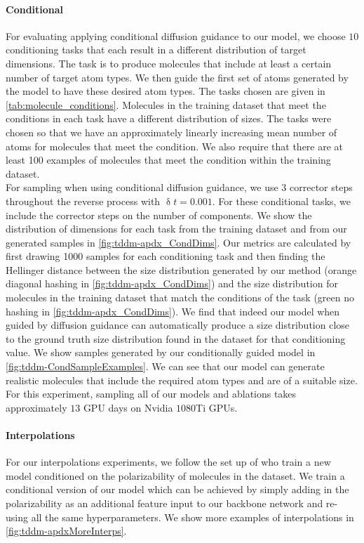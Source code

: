 \paragraph{Conditional}
For evaluating applying conditional diffusion guidance to our model, we choose $10$ conditioning tasks that each result in a different distribution of target dimensions. The task is to produce molecules that include at least a certain number of target atom types. We then guide the first set of atoms generated by the model to have these desired atom types. The tasks chosen are given in \cref{tab:molecule_conditions}. Molecules in the training dataset that meet the conditions in each task have a different distribution of sizes. The tasks were chosen so that we have an approximately linearly increasing mean number of atoms for molecules that meet the condition. We also require that there are at least 100 examples of molecules that meet the condition within the training dataset.\\

For sampling when using conditional diffusion guidance, we use $3$ corrector steps throughout the reverse process with $\updelta t = 0.001$. For these conditional tasks, we include the corrector steps on the number of components. We show the distribution of dimensions for each task from the training dataset and from our generated samples in \cref{fig:tddm-apdx_CondDims}. Our metrics are calculated by first drawing 1000 samples for each conditioning task and then finding the Hellinger distance between the size distribution generated by our method (orange diagonal hashing in \cref{fig:tddm-apdx_CondDims}) and the size distribution for molecules in the training dataset that match the conditions of the task (green no hashing in \cref{fig:tddm-apdx_CondDims}). We find that indeed our model when guided by diffusion guidance can automatically produce a size distribution close to the ground truth size distribution found in the dataset for that conditioning value. We show samples generated by our conditionally guided model in \cref{fig:tddm-CondSampleExamples}. We can see that our model can generate realistic molecules that include the required atom types and are of a suitable size. For this experiment, sampling all of our models and ablations takes approximately $13$ GPU days on Nvidia $1080$Ti GPUs.

\paragraph{Interpolations}
For our interpolations experiments, we follow the set up of \citet{hoogeboom2022equivariant} who train a new model conditioned on the polarizability of molecules in the dataset. We train a conditional version of our model which can be achieved by simply adding in the polarizability as an additional feature input to our backbone network and re-using all the same hyperparameters. We show more examples of interpolations in \cref{fig:tddm-apdxMoreInterps}.


